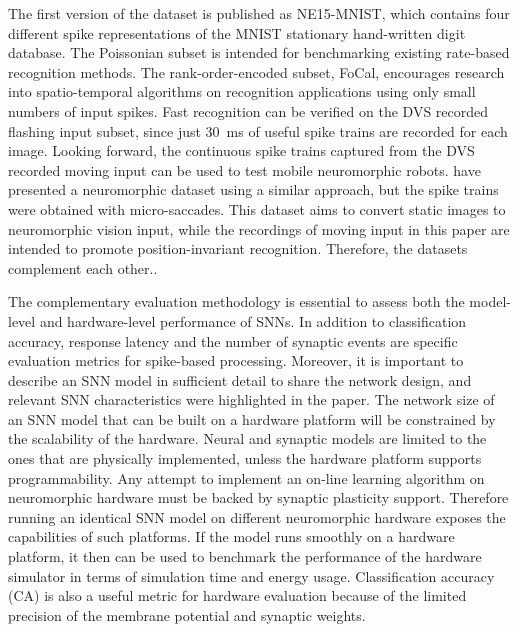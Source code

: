The first version of the dataset is published as NE15-MNIST, which contains four different spike representations of the MNIST stationary hand-written digit database.
The Poissonian subset is intended for benchmarking existing rate-based recognition methods.
The rank-order-encoded subset, FoCal, encourages research into spatio-temporal algorithms on recognition applications using only small numbers of input spikes.
Fast recognition can be verified on the DVS recorded flashing input subset, since just 30~ms of useful spike trains are recorded for each image.
Looking forward, the continuous spike trains captured from the DVS recorded moving input can be used to test mobile neuromorphic robots.
\cite{orchard2015convert} have presented a neuromorphic dataset using a similar approach, but the spike trains were obtained with micro-saccades.
This dataset aims to convert static images to neuromorphic vision input, while the recordings of moving input in this paper are intended to promote position-invariant recognition.
Therefore, the datasets complement each other..

The complementary evaluation methodology is essential to assess both the model-level and hardware-level performance of SNNs.
In addition to classification accuracy, response latency and the number of synaptic events are specific evaluation metrics for spike-based processing.
Moreover, it is important to describe an SNN model in sufficient detail to share the network design, and relevant SNN characteristics were highlighted in the paper.  
The network size of an SNN model that can be built on a hardware platform will be constrained by the scalability of the hardware.
Neural and synaptic models are limited to the ones that are physically implemented, unless the hardware platform supports programmability.
Any attempt to implement an on-line learning algorithm on neuromorphic hardware must be backed by synaptic plasticity support.
Therefore running an identical SNN model on different neuromorphic hardware exposes the capabilities of such platforms.
If the model runs smoothly on a hardware platform, it then can be used to benchmark the performance of the hardware simulator in terms of simulation time and energy usage.
Classification accuracy (CA) is also a useful metric for hardware evaluation because of the limited precision of the membrane potential and synaptic weights.

